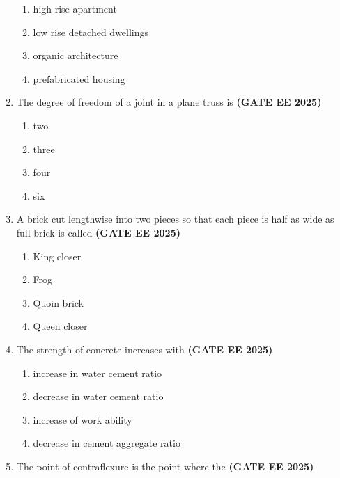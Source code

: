 \documentclass[journal,12pt,onecolumn]{IEEEtran}
\theoremstyle{remark}
\begin{document}
\begin{enumerate}
\begin{enumerate}
    \item high rise apartment
    \item low rise detached dwellings
    \item organic architecture
    \item prefabricated housing
\end{enumerate}
\item The degree of freedom of a joint in a plane truss is \hfill \textbf{(GATE EE 2025)}
\begin{multicols}{4}
\begin{enumerate}
    \item two
    \item three
    \item four
    \item six
\end{enumerate}
\end{multicols}
\item A brick cut lengthwise into two pieces so that each piece is half as wide as full brick is called \hfill \textbf{(GATE EE 2025)}
\begin{multicols}{4}
\begin{enumerate}
    \item King closer
    \item Frog
    \item Quoin brick
    \item Queen closer
\end{enumerate}
\end{multicols}
\item The strength of concrete increases with \hfill \textbf{(GATE EE 2025)}
\begin{enumerate}
    \item increase in water cement ratio
    \item decrease in water cement ratio
    \item increase of work ability
    \item decrease in cement aggregate ratio
\end{enumerate}
\item The point of contraflexure is the point where the \hfill \textbf{(GATE EE 2025)}
\begin{enumerate}
\end{enumerate}
\end{enumerate}
\end{document}
